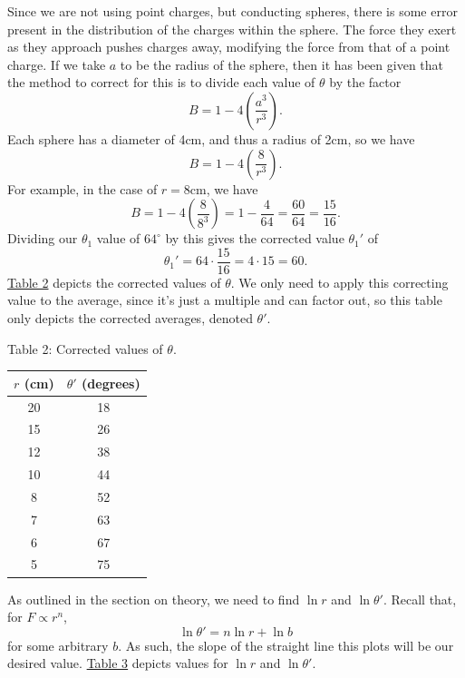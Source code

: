 \documentclass[11pt, letterpaper]{report}
\begin{document}
Since we are not using point charges, but conducting spheres, there is some error present in the distribution of the charges within the sphere. The force they exert as they approach pushes charges away, modifying the force from that of a point charge. If we take $a$ to be the radius of the sphere, then it has been given that the method to correct for this is to divide each value of $\theta $ by the factor
 \[
	B=1-4\left( \frac{a^3}{r^3} \right) 
.\]
Each sphere has a diameter of 4cm, and thus a radius of 2cm, so we have
\[
	B=1-4\left( \frac{8}{r^3} \right) 
.\]
For example, in the case of $r=8 $cm, we have
\[
	B=1-4\left( \frac{8}{8^3} \right) =1-\frac{4}{64}=\frac{60}{64}=\frac{15}{16}
.\]
Dividing our $\theta_1$ value of $64^\circ $ by this gives the corrected value $\theta_1'$ of
\[
	\theta_1' = 64\cdot \frac{15}{16}=4\cdot 15=60
.\]
\hyperref[tab:2]{Table 2} depicts the corrected values of $\theta $. We only need to apply this correcting value to the average, since it's just a multiple and can factor out, so this table only depicts the corrected averages, denoted $\theta '$.

\begin{center}
	Table 2: Corrected values of $\theta $.\label{tab:1}\\\vspace*{5pt}
	\begin{tabular}{c|c}
		$r$ (cm)&$\theta '$ (degrees)\\
		\hline
		20&18\\
		15&26\\
		12&38\\
		10&44\\
		8&52\\
		7&63\\
		6&67\\
		5&75
	\end{tabular}
\end{center}

As outlined in the section on theory, we need to find $\ln r$ and $\ln \theta'$. Recall that, for $F\propto r^n$,
\[
	\ln \theta '=n\ln r+\ln b
\]
for some arbitrary $b$. As such, the slope of the straight line this plots will be our desired value. \hyperref[tab:3]{Table 3} depicts values for $\ln r$ and $\ln \theta '$.
\end{document}
